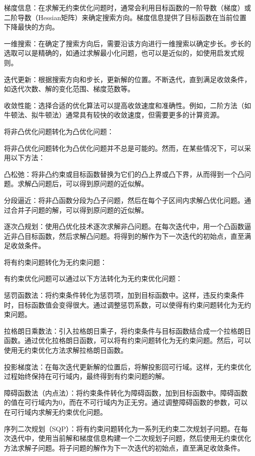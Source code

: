 \documentclass{article}
\begin{document}
梯度信息：在求解无约束优化问题时，通常会利用目标函数的一阶导数（梯度）或二阶导数（Hessian矩阵）来确定搜索方向。梯度信息提供了目标函数在当前位置下降最快的方向。

一维搜索：在确定了搜索方向后，需要沿该方向进行一维搜索以确定步长。步长的选取可以是精确的，如通过求解最小化问题，也可以是近似的，如使用启发式规则。

迭代更新：根据搜索方向和步长，更新解的位置。不断迭代，直到满足收敛条件，如迭代次数、解的变化范围、梯度范数等。

收敛性能：选择合适的优化算法可以提高收敛速度和准确性。例如，二阶方法（如牛顿法、拟牛顿法）通常具有较快的收敛速度，但需要更多的计算资源。

将非凸优化问题转化为凸优化问题：

将非凸优化问题转化为凸优化问题并不总是可能的。然而，在某些情况下，可以采用以下方法：

凸松弛：将非凸约束或目标函数替换为它们的凸上界或凸下界，从而得到一个凸问题。求解凸问题后，可以得到原问题的近似解。

分段逼近：将非凸函数分段为凸子问题，然后在每个子区间内求解凸优化问题。通过合并子问题的解，可以得到原问题的近似解。

逐次凸规划：使用凸优化技术逐次求解非凸问题。在每次迭代中，用一个凸函数逼近非凸目标函数，然后求解凸问题。将得到的解作为下一次迭代的初始点，直至满足收敛条件。

将有约束问题转化为无约束问题：

有约束优化问题可以通过以下方法转化为无约束优化问题：

惩罚函数法：将约束条件转化为惩罚项，加到目标函数中。这样，违反约束条件时，目标函数值会变得很大。通过调整惩罚系数，可以使得有约束问题转化为无约束问题。

拉格朗日乘数法：引入拉格朗日乘子，将约束条件与目标函数结合成一个拉格朗日函数。通过优化拉格朗日函数，可以将有约束问题转化为无约束问题。然后，可以使用无约束优化方法求解拉格朗日函数。

投影梯度法：在每次迭代更新解的位置后，将解投影回可行域。这样，无约束优化过程始终保持在可行域内，最终得到有约束问题的解。

障碍函数法（内点法）：将约束条件转化为障碍函数，加到目标函数中。障碍函数的值在可行域内为0，而在不可行域内为正无穷。通过调整障碍函数的参数，可以在可行域内求解无约束优化问题。

序列二次规划（SQP）：将有约束问题转化为一系列无约束二次规划子问题。在每次迭代中，使用当前解和梯度信息构建一个二次规划子问题，然后使用无约束优化方法求解子问题。将子问题的解作为下一次迭代的初始点，直至满足收敛条件。
\end{document}
